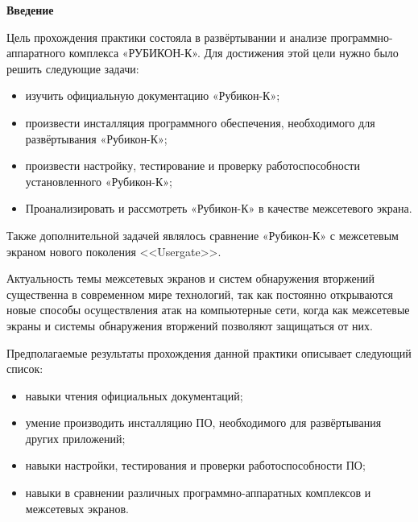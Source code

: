\newcommand{\definition}[1]{\textbf{#1}}

\newcommand{\CLIA}{\textbf{CLI-A}}
\newcommand{\CLIB}{\textbf{CLI-B}}
\newcommand{\CLIEXT}{\textbf{CLI-EXT}}
\newcommand{\DC}{\textbf{DC}}
\newcommand{\UTM}{\textbf{UTM}}
\newcommand{\ISP}{\textbf{ISP}}

\begin{center}
	\textbf{\Large Введение}
\end{center}

Цель прохождения практики состояла в развёртывании и анализе программно-аппаратного комплекса «РУБИКОН-К». Для достижения этой цели нужно было решить следующие задачи:
		
\begin{itemize}[nosep]
	\item изучить официальную документацию «Рубикон-К»;
			
	\item произвести инсталляция программного обеспечения, необходимого для развёртывания «Рубикон-К»;
			
	\item произвести настройку, тестирование и проверку работоспособности установленного «Рубикон-К»;
			
	\item Проанализировать и рассмотреть «Рубикон-К» в качестве межсетевого экрана.
\end{itemize}
		
\noindent Также дополнительной задачей являлось сравнение «Рубикон-К» с межсетевым экраном нового поколения <<Usergate>>.

Актуальность темы межсетевых экранов и систем обнаружения вторжений существенна в современном мире технологий, так как постоянно открываются новые способы осуществления атак на компьютерные сети, когда как межсетевые экраны и системы обнаружения вторжений позволяют защищаться от них. 

Предполагаемые результаты прохождения данной практики описывает следующий список:

\begin{itemize}[nosep]
	\item навыки чтения официальных документаций;
		
	\item умение производить инсталляцию ПО, необходимого для развёртывания других приложений;
		
	\item навыки настройки, тестирования и проверки работоспособности ПО;
	
	\item навыки в сравнении различных программно-аппаратных комплексов и межсетевых экранов.
\end{itemize}

